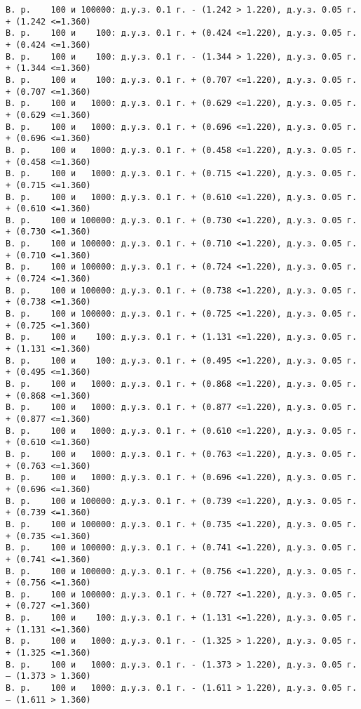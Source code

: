 \documentclass[11pt]{article}
\begin{document}
{\begin{Verbatim}[commandchars=\\\{\}]
В. р.    100 и 100000: д.у.з. 0.1 г. - (1.242 > 1.220), д.у.з. 0.05 г. + (1.242 <=1.360)
В. р.    100 и    100: д.у.з. 0.1 г. + (0.424 <=1.220), д.у.з. 0.05 г. + (0.424 <=1.360)
В. р.    100 и    100: д.у.з. 0.1 г. - (1.344 > 1.220), д.у.з. 0.05 г. + (1.344 <=1.360)
В. р.    100 и    100: д.у.з. 0.1 г. + (0.707 <=1.220), д.у.з. 0.05 г. + (0.707 <=1.360)
В. р.    100 и   1000: д.у.з. 0.1 г. + (0.629 <=1.220), д.у.з. 0.05 г. + (0.629 <=1.360)
В. р.    100 и   1000: д.у.з. 0.1 г. + (0.696 <=1.220), д.у.з. 0.05 г. + (0.696 <=1.360)
В. р.    100 и   1000: д.у.з. 0.1 г. + (0.458 <=1.220), д.у.з. 0.05 г. + (0.458 <=1.360)
В. р.    100 и   1000: д.у.з. 0.1 г. + (0.715 <=1.220), д.у.з. 0.05 г. + (0.715 <=1.360)
В. р.    100 и   1000: д.у.з. 0.1 г. + (0.610 <=1.220), д.у.з. 0.05 г. + (0.610 <=1.360)
В. р.    100 и 100000: д.у.з. 0.1 г. + (0.730 <=1.220), д.у.з. 0.05 г. + (0.730 <=1.360)
В. р.    100 и 100000: д.у.з. 0.1 г. + (0.710 <=1.220), д.у.з. 0.05 г. + (0.710 <=1.360)
В. р.    100 и 100000: д.у.з. 0.1 г. + (0.724 <=1.220), д.у.з. 0.05 г. + (0.724 <=1.360)
В. р.    100 и 100000: д.у.з. 0.1 г. + (0.738 <=1.220), д.у.з. 0.05 г. + (0.738 <=1.360)
В. р.    100 и 100000: д.у.з. 0.1 г. + (0.725 <=1.220), д.у.з. 0.05 г. + (0.725 <=1.360)
В. р.    100 и    100: д.у.з. 0.1 г. + (1.131 <=1.220), д.у.з. 0.05 г. + (1.131 <=1.360)
В. р.    100 и    100: д.у.з. 0.1 г. + (0.495 <=1.220), д.у.з. 0.05 г. + (0.495 <=1.360)
В. р.    100 и   1000: д.у.з. 0.1 г. + (0.868 <=1.220), д.у.з. 0.05 г. + (0.868 <=1.360)
В. р.    100 и   1000: д.у.з. 0.1 г. + (0.877 <=1.220), д.у.з. 0.05 г. + (0.877 <=1.360)
В. р.    100 и   1000: д.у.з. 0.1 г. + (0.610 <=1.220), д.у.з. 0.05 г. + (0.610 <=1.360)
В. р.    100 и   1000: д.у.з. 0.1 г. + (0.763 <=1.220), д.у.з. 0.05 г. + (0.763 <=1.360)
В. р.    100 и   1000: д.у.з. 0.1 г. + (0.696 <=1.220), д.у.з. 0.05 г. + (0.696 <=1.360)
В. р.    100 и 100000: д.у.з. 0.1 г. + (0.739 <=1.220), д.у.з. 0.05 г. + (0.739 <=1.360)
В. р.    100 и 100000: д.у.з. 0.1 г. + (0.735 <=1.220), д.у.з. 0.05 г. + (0.735 <=1.360)
В. р.    100 и 100000: д.у.з. 0.1 г. + (0.741 <=1.220), д.у.з. 0.05 г. + (0.741 <=1.360)
В. р.    100 и 100000: д.у.з. 0.1 г. + (0.756 <=1.220), д.у.з. 0.05 г. + (0.756 <=1.360)
В. р.    100 и 100000: д.у.з. 0.1 г. + (0.727 <=1.220), д.у.з. 0.05 г. + (0.727 <=1.360)
В. р.    100 и    100: д.у.з. 0.1 г. + (1.131 <=1.220), д.у.з. 0.05 г. + (1.131 <=1.360)
В. р.    100 и   1000: д.у.з. 0.1 г. - (1.325 > 1.220), д.у.з. 0.05 г. + (1.325 <=1.360)
В. р.    100 и   1000: д.у.з. 0.1 г. - (1.373 > 1.220), д.у.з. 0.05 г. – (1.373 > 1.360)
В. р.    100 и   1000: д.у.з. 0.1 г. - (1.611 > 1.220), д.у.з. 0.05 г. – (1.611 > 1.360)

\end{Verbatim}}
\end{document}
